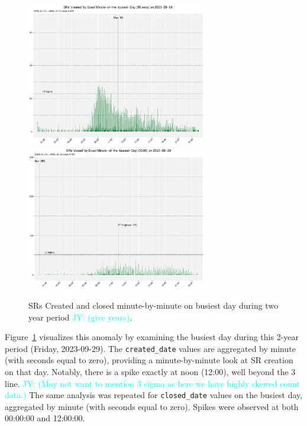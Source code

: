 \documentclass[linenumber]{jdsart}
\newcommand{\jy}[1]{\textcolor{cyan}{JY: (#1)}}
\begin{document}
\begin{figure}[tbp]
  \centering
  \includegraphics[width=0.7\textwidth]{2-year-trend_SR_created_by_minute_of_busiest_day.pdf}
  \includegraphics[width=0.7\textwidth]{2-year-trend-SR_closed_by_minute_of_busiest_day.pdf}
  \caption{SRs Created and closed minute-by-minute on busiest day
    during two year period \jy{give years}.}
  \label{fig:busiest}
\end{figure}	

Figure~\ref{fig:busiest} visualizes this anomaly by examining the 
busiest day during this 2-year period (Friday, 2023-09-29). The 
\texttt{created\_date} values are aggregated by minute (with seconds 
equal to zero), providing a minute-by-minute look at SR creation on 
that day. Notably, there is a spike exactly at noon (12:00), well 
beyond the 3\textsigma{} line. \jy{May not want to mention 3 sigma as
  here we have highly skewed count data.}
The same analysis was repeated for 
\texttt{closed\_date} values on the busiest day, aggregated by minute 
(with seconds equal to zero). Spikes were observed at both 00:00:00 
and 12:00:00.
\end{document}
